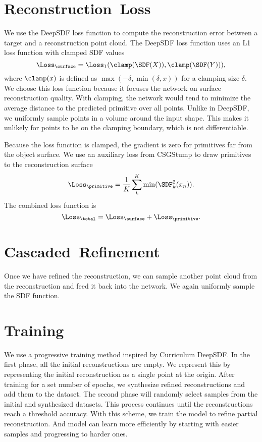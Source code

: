 \section{Reconstruction~Loss}
\label{sec:reconstruction_loss}

We use the DeepSDF loss function to compute the reconstruction error between a target and a reconstruction point cloud. The DeepSDF loss function uses an L1 loss function with clamped SDF values
\[\Loss_{\surface}=\Loss_1(\clamp(\SDF(X)), \clamp(\SDF(Y))),\]
where $\clamp(x)$ is defined as $\max(-\delta, \min(\delta, x))$ for a clamping size $\delta$. We choose this loss function because it focuses the network on surface reconstruction quality. With clamping, the network would tend to minimize the average distance to the predicted primitive over all points. Unlike in DeepSDF, we uniformly sample points in a volume around the input shape. This makes it unlikely for points to be on the clamping boundary, which is not differentiable.

Because the loss function is clamped, the gradient is zero for primitives far from the object surface. We use an auxiliary loss from CSGStump to draw primitives to the reconstruction surface
\[\Loss_{\primitive} = \frac{1}{K} \sum_{k}^{K} \min ( \SDF_k^2(x_n) ).\]
The combined loss function is
\[\Loss_{\total} = \Loss_{\surface} + \Loss_{\primitive}.\]


\section{Cascaded~Refinement}
\label{sec:cascaded_refinement}

Once we have refined the reconstruction, we can sample another point cloud from the reconstruction and feed it back into the network. We again uniformly sample the SDF function.


\section{Training}
\label{sec:training}

We use a progressive training method inspired by Curriculum DeepSDF. In the first phase, all the initial reconstructions are empty. We represent this by representing the initial reconstruction as a single point at the origin. After training for a set number of epochs, we synthesize refined reconstructions and add them to the dataset. The second phase will randomly select samples from the initial and synthesized datasets. This process continues until the reconstructions reach a threshold accuracy. With this scheme, we train the model to refine partial reconstruction. And model can learn more efficiently by starting with easier samples and progressing to harder ones.
